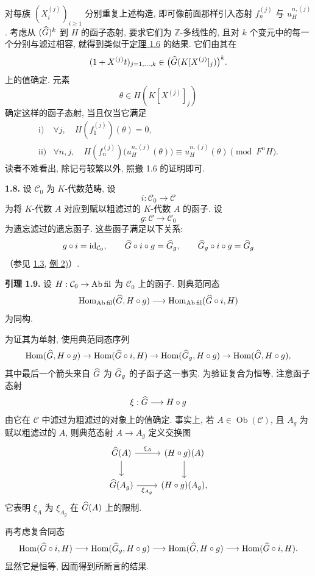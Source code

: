 对每族 \((X_i^{(j)})_{i\geq 1}\) 分别重复上述构造, 即可像前面那样引入态射 \(f_n^{(j)}\) 与 \(u_H^{n,(j)}\). 考虑从 \((\widehat G)^k\) 到 \(H\) 的函子态射, 要求它们为 \(\mathbb Z\)-多线性的, 且对 \(k\) 个变元中的每一个分别与滤过相容, 就得到类似于\hyperlink{sga6.e05.thm.1-6}{定理 1.6} 的结果. 它们由其在
\[
  (1+X^{(j)}t)_{j=1,\ldots,k}
  \in \bigl(\widehat G(K[X^{(j)}]_j)\bigr)^k.
\]
上的值确定. 元素
\[
  \theta\in H(K[X^{(j)}]_j)
\]
确定这样的函子态射, 当且仅当它满足
\[
\begin{array}{ll}
\text{i)} & \forall j,\quad H(f_1^{(j)})(\theta)=0,\\[0.3em]
\text{ii)}& \forall n,j,\quad
 H(f_n^{(j)})\bigl(u_H^{n,(j)}(\theta)\bigr)
 \equiv u_H^{n,(j)}(\theta)\pmod{F^nH}.
\end{array}
\]
读者不难看出, 除记号较繁以外, 照搬 1.6 的证明即可.

\textbf{1.8.} 设 \(\mathcal C_0\) 为 \(K\)-代数范畴, 设
\[
  i:\mathcal C_0\longrightarrow\mathcal C
\]
为将 \(K\)-代数 \(A\) 对应到赋以粗滤过的 \(K\)-代数 \(A\) 的函子. 设
\[
  g:\mathcal C\longrightarrow\mathcal C_0
\]
为遗忘滤过的遗忘函子. 这些函子满足以下关系:
\[
  g\circ i=\operatorname{id}_{\mathcal C_0},\qquad
  \widehat G\circ i\circ g=\widehat G_g,\qquad
  \widehat G_g\circ i\circ g=\widehat G_g
\]
（参见 \hyperlink{sga6.e05.para.1-3}{1.3}, \hyperlink{sga6.e05.ex.1-3-2}{例 2)}）.

\textbf{引理 1.9.} 设 \(H:\mathcal C_0\to\mathrm{Ab\,fil}\) 为 \(\mathcal C_0\) 上的函子. 则典范同态
\[
  \operatorname{Hom}_{\mathrm{Ab\,fil}}(\widehat G,H\circ g)
  \longrightarrow
  \operatorname{Hom}_{\mathrm{Ab\,fil}}(\widehat G\circ i,H)
\]
为同构.

为证其为单射, 使用典范同态序列
\[
 \operatorname{Hom}(\widehat G,H\circ g)\to
 \operatorname{Hom}(\widehat G\circ i,H)\to
 \operatorname{Hom}(\widehat G_g,H\circ g)\to
 \operatorname{Hom}(\widehat G,H\circ g),
\]
其中最后一个箭头来自 \(\widehat G\) 为 \(\widehat G_g\) 的子函子这一事实. 为验证复合为恒等, 注意函子态射
\[
  \xi:\widehat G\longrightarrow H\circ g
\]
由它在 \(\mathcal C\) 中滤过为粗滤过的对象上的值确定. 事实上, 若 \(A\in\operatorname{Ob}(\mathcal C)\), 且 \(A_g\) 为赋以粗滤过的 \(A\), 则典范态射 \(A\to A_g\) 定义交换图
\[
\begin{tikzcd}
\Ghat(A) \arrow[r,"\xi_A"] \arrow[d] &
(H\circ g)(A) \arrow[d]\\
\Ghat(A_g) \arrow[r,"\xi_{A_g}"'] &
(H\circ g)(A_g),
\end{tikzcd}
\]
它表明 \(\xi_A\) 为 \(\xi_{A_g}\) 在 \(\widehat G(A)\) 上的限制.

再考虑复合同态
\[
  \operatorname{Hom}(\widehat G\circ i,H)\longrightarrow
  \operatorname{Hom}(\widehat G_g,H\circ g)\longrightarrow
  \operatorname{Hom}(\widehat G,H\circ g)\longrightarrow
  \operatorname{Hom}(\widehat G\circ i,H).
\]
显然它是恒等, 因而得到所断言的结果.

